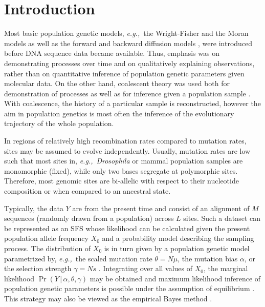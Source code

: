 \documentclass[preprint]{elsarticle}
\newcommand\given{{\,|\,}}
\newcommand\eg{{\it e.g.,}}
\begin{document}
\linenumbers

\listoftodos

\section{Introduction}

Most basic population genetic models, \eg\ the Wright-Fisher and the Moran models as well as the forward and backward diffusion models \citep[reviewed in][]{Ewen04}, were introduced before DNA sequence data became available. Thus, emphasis was on demonstrating processes over time and on qualitatively explaining observations, rather than on quantitative inference of population genetic parameters given molecular data. On the other hand, coalescent theory \citep{King82} was used both for demonstration of processes as well as for inference given a population sample \citep{Hein05,Wake09}. With coalescence, the history of a particular sample is reconstructed, however the aim in population genetics is most often the inference of the evolutionary trajectory of the whole population.

In regions of relatively high recombination rates compared to mutation rates, sites may be assumed to evolve independently. Usually, mutation rates are low such that most sites in, \eg\ \textit{Drosophila} or mammal population samples are monomorphic (fixed), while only two bases segregate at polymorphic sites. Therefore, most genomic sites are bi-allelic with respect to their nucleotide composition or when compared to an ancestral state. %

Typically, the data $Y$ are from the present time and consist of an alignment of $M$ sequences (randomly drawn from a population) across $L$ sites. Such a dataset can be represented as an SFS whose likelihood can be calculated given the present population allele frequency $X_0$ and a probability model describing the sampling process. The distribution of $X_0$ is in turn given by a population genetic model parametrized by, \eg\ the scaled mutation rate $\theta=N\mu$, the mutation bias $\alpha$, or the selection strength $\gamma=Ns$ \citep[as defined in][]{Vogl15}. Integrating over all values of $X_0$, the marginal likelihood $\Pr(Y\given \alpha,\theta,\gamma)$ may be obtained and maximum likelihood inference of population genetic parameters is possible under the assumption of equilibrium \citep{Vogl14b,Vogl15}. This strategy may also be viewed as the empirical Bayes method \citep[\eg][]{Carl00}. 
\end{document}

